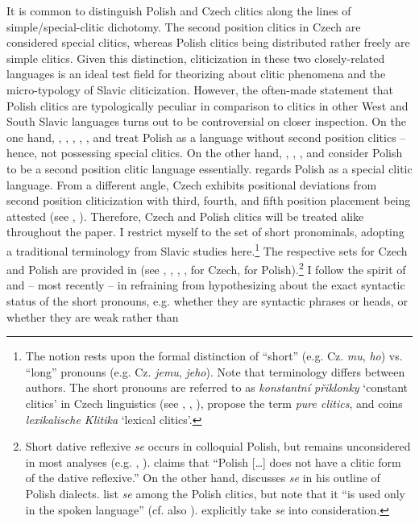 \documentclass[output=paper,colorlinks,citecolor=brown]{langscibook}
\begin{document}
It is common to distinguish Polish and Czech clitics along the lines of  simple/special-clitic dichotomy. The second position clitics in Czech are considered special clitics, whereas Polish clitics being distributed rather freely are simple clitics. Given this distinction, cliticization in these two closely-related languages is an ideal test field for theorizing about clitic phenomena and the micro-typology of Slavic cliticization. However, the often-made statement that Polish clitics are typologically peculiar in comparison to clitics in other West and South Slavic languages turns out to be controversial on closer inspection. On the one hand, \citet{Rappaport1988}, \citet{Dziwirek1998}, \citet{Kupsc2000}, \citet{BorsleyRivero1994}, \citet{Franks2009, Franks2010}, and \citet{FranksKing2000} treat Polish as a language without second position clitics -- hence, not possessing special clitics. On the other hand, \citet[725]{Rothstein1993}, \citet[62]{Urbanczyk1976}, \citet[§4.8 Footnote~23]{Veselovska1995}, and \citet[85]{Dimitrova-Vulchanova1999} consider Polish to be a second position clitic language essentially. \citet[390]{Spencer1991} regards Polish as a special clitic language. From a different angle, Czech exhibits positional deviations from second position cliticization with third, fourth, and fifth position placement being attested (see \citealt[103--112]{Hana2007}, \citealt[177--178]{Junghanns2021}). Therefore, Czech and Polish clitics will be treated alike throughout the paper. I restrict myself to the set of short pronominals, adopting a traditional terminology from Slavic studies here.\footnote{The notion rests upon the formal distinction of “short” (e.g. Cz. \textit{mu}, \textit{ho}) vs. “long” pronouns (e.g. Cz. \textit{jemu}, \textit{jeho}). Note that terminology differs between authors. The short pronouns are referred to as \textit{konstantní přiklonky} ‘constant clitics’ in Czech linguistics (see \citealt{Travnicek1959}, \citealt{Rosen2001}, \citealt{Hana2007}), \citet{AvgustinovaOliva1997} propose the term \textit{pure clitics}, and \citet{Junghanns2002b} coins \textit{lexikalische Klitika} ‘lexical clitics’.} The respective sets for Czech and Polish are provided in  (see \citealt{Fried1994}, \citealt{AvgustinovaOliva1997}, \citealt{Rosen2001}, \citealt{Junghanns2002b}, \citealt{Petkevic2009} for Czech, \citealt{Kupsc2000} for Polish).\footnote{Short dative reflexive \textit{se} occurs in colloquial Polish, but remains unconsidered in most analyses (e.g. \citealt{Spencer1991}, \citealt{Kupsc2000}). \citet[137]{Rubadeau1996} claims that ``Polish […] does not have a clitic form of the dative reflexive.'' On the other hand, \citet[58]{Urbanczyk1976} discusses \textit{se} in his outline of Polish dialects. \citet[150]{FranksKing2000} list \textit{se} among the Polish clitics, but note that it “is used only in the spoken language” (cf. also \citealt[702]{Rothstein1993}). \citet{AguadoDogil1989} explicitly take \textit{se} into consideration.} I follow the spirit of \citet{Dotlačil2007} and -- most recently -- \citet{Adam2019} in refraining from hypothesizing about the exact syntactic status of the short pronouns, e.g. whether they are syntactic phrases or heads, or whether they are weak rather than 
\end{document}
